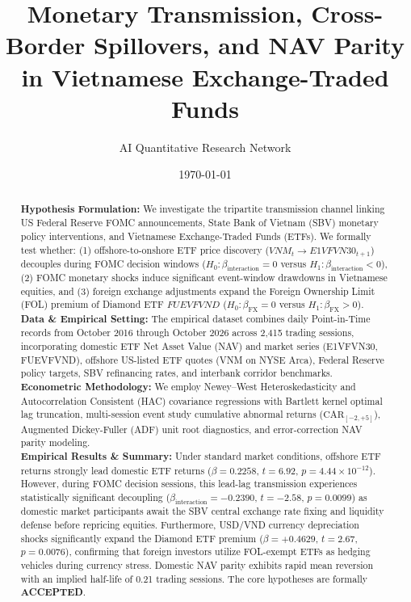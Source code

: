 \documentclass{article}
\title{\textbf{Monetary Transmission, Cross-Border Spillovers, and NAV Parity in Vietnamese Exchange-Traded Funds}}
\author[1*]{AI Quantitative Research Network}
\affil[1]{Autonomous Financial Machine Learning \& Empirical Econometrics Lab, Ho Chi Minh City, Vietnam}
\affil[*]{Contact: \texttt{research@vnresearch.org}}
\date{\today}
\begin{document}
\maketitle

\begin{abstract}
\noindent \textbf{Hypothesis Formulation:} We investigate the tripartite transmission channel linking US Federal Reserve FOMC announcements, State Bank of Vietnam (SBV) monetary policy interventions, and Vietnamese Exchange-Traded Funds (ETFs). We formally test whether: (1) offshore-to-onshore ETF price discovery ($VNM_t \to E1VFVN30_{t+1}$) decouples during FOMC decision windows ($H_0: \beta_{\text{interaction}} = 0$ versus $H_1: \beta_{\text{interaction}} < 0$), (2) FOMC monetary shocks induce significant event-window drawdowns in Vietnamese equities, and (3) foreign exchange adjustments expand the Foreign Ownership Limit (FOL) premium of Diamond ETF $FUEVFVND$ ($H_0: \beta_{\text{FX}} = 0$ versus $H_1: \beta_{\text{FX}} > 0$). \\
\textbf{Data \& Empirical Setting:} The empirical dataset combines daily Point-in-Time records from October 2016 through October 2026 across 2,415 trading sessions, incorporating domestic ETF Net Asset Value (NAV) and market series (E1VFVN30, FUEVFVND), offshore US-listed ETF quotes (VNM on NYSE Arca), Federal Reserve policy targets, SBV refinancing rates, and interbank corridor benchmarks. \\
\textbf{Econometric Methodology:} We employ Newey--West Heteroskedasticity and Autocorrelation Consistent (HAC) covariance regressions with Bartlett kernel optimal lag truncation, multi-session event study cumulative abnormal returns ($\text{CAR}_{[-2, +5]}$), Augmented Dickey-Fuller (ADF) unit root diagnostics, and error-correction NAV parity modeling. \\
\textbf{Empirical Results \& Summary:} Under standard market conditions, offshore ETF returns strongly lead domestic ETF returns ($\beta = 0.2258$, $t = 6.92$, $p = 4.44 \times 10^{-12}$). However, during FOMC decision sessions, this lead-lag transmission experiences statistically significant decoupling ($\beta_{\text{interaction}} = -0.2390$, $t = -2.58$, $p = 0.0099$) as domestic market participants await the SBV central exchange rate fixing and liquidity defense before repricing equities. Furthermore, USD/VND currency depreciation shocks significantly expand the Diamond ETF premium ($\beta = +0.4629$, $t = 2.67$, $p = 0.0076$), confirming that foreign investors utilize FOL-exempt ETFs as hedging vehicles during currency stress. Domestic NAV parity exhibits rapid mean reversion with an implied half-life of 0.21 trading sessions. The core hypotheses are formally \textbf{ACCEPTED}.
\end{abstract}
\end{document}
